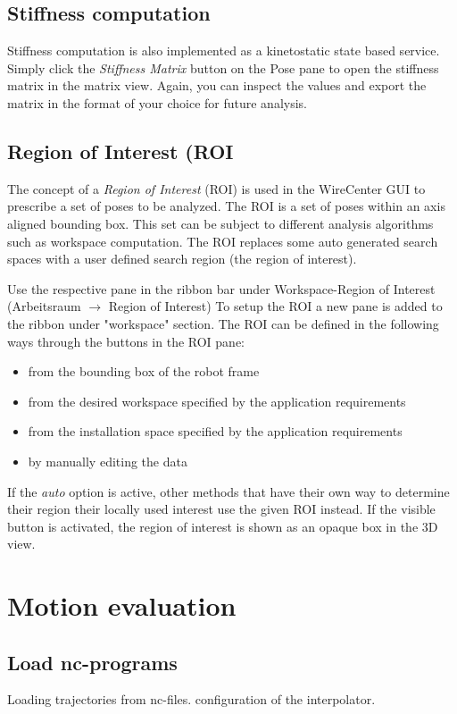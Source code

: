 \documentclass[11pt,a4paper,onepage,openany]{book}
\begin{document}
\section{Stiffness computation}
Stiffness computation is also implemented as a kinetostatic state based service.
Simply click the \emph{Stiffness Matrix} button on the Pose pane to open the stiffness
matrix in the matrix view. Again, you can inspect the values and export the matrix
in the format of your choice for future analysis. 

\section{Region of Interest (ROI}
The concept of a \emph{Region of Interest} (ROI) is used in the WireCenter GUI
to prescribe a set of poses to be analyzed. The ROI is a set of poses within an
axis aligned bounding box. This set can be subject to different analysis
algorithms such as workspace computation. The ROI replaces some auto generated
search spaces with a user defined search region (the region of interest).

Use the respective pane in the ribbon bar under Workspace-Region of Interest
(Arbeitsraum $\rightarrow$ Region of Interest) To setup the ROI a new pane is
added to the ribbon under "workspace" section. The ROI can be defined in the
following ways through the buttons in the ROI pane:
\begin{itemize}
\item from the bounding box of the robot frame
\item from the desired workspace specified by the application requirements
\item from the installation space specified by the application requirements
\item by manually editing the data
\end{itemize}
If the \emph{auto} option is active, other methods that have their own way to
determine their region their locally used interest use the given ROI instead.
If the visible button is activated, the region of interest is shown as an
opaque box in the 3D view.


\chapter{Motion evaluation}\label{sec:MotionEvaluation}%
\section{Load nc-programs}
Loading trajectories from nc-files. configuration of the interpolator.
\end{document}
